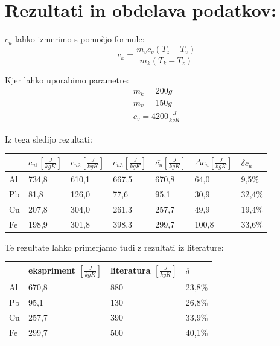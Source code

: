 \documentclass[a4paper]{article}
\begin{document}
\begin{multicols}{2}
\end{multicols}
\section*{Rezultati in obdelava podatkov:}

\begin{multicols}{2}
$c_u$ lahko izmerimo s pomočjo formule:
\begin{equation}
   c_k = \frac{m_v c_v (T_z - T_v)}{m_k (T_k - T_z)}
\end{equation}

\columnbreak

Kjer lahko uporabimo parametre:
\begin{gather}
   m_k = 200g \\
   m_v = 150g \\
   c_v = 4200 \frac{J}{kgK}
\end{gather}

\end{multicols}

Iz tega sledijo rezultati:
\begin{table}[H]
   \centering
   \renewcommand{\arraystretch}{1.5}
   \begin{tabular}{lllllll}
      & $c_{u1}[\frac{J}{kgK}]$ & $c_{u2}[\frac{J}{kgK}]$ & $c_{u3}[\frac{J}{kgK}]$ & $\overline{c_u}[\frac{J}{kgK}]$ & $\Delta c_u[\frac{J}{kgK}]$ & $\delta c_u$ \\
      \hline
   Al & 734,8    & 610,1   & 667,5   & 670,8                   & 64,0                    & 9,5\%  \\
Pb & 81,8     & 126,0   & 77,6    & 95,1                    & 30,9                    & 32,4\% \\
Cu & 207,8    & 304,0   & 261,3   & 257,7                   & 49,9                    & 19,4\% \\
Fe & 198,9    & 301,8   & 398,3   & 299,7                   & 100,8                   & 33,6\%
   
   \end{tabular}
   \end{table}

Te rezultate lahko primerjamo tudi z rezultati iz literature:
\begin{table}[H]
   \centering
   \renewcommand{\arraystretch}{1.5}
   \begin{tabular}{llll}
      & ekspriment $[\frac{J}{kgK}]$ & literatura $[\frac{J}{kgK}]$ & $\delta $ \\
      \hline
      Al & 670,8 & 880 & 23,8\% \\
      Pb & 95,1  & 130 & 26,8\% \\
      Cu & 257,7 & 390 & 33,9\% \\
      Fe & 299,7 & 500 & 40,1\%
   \end{tabular}
   \end{table}
\end{document}
